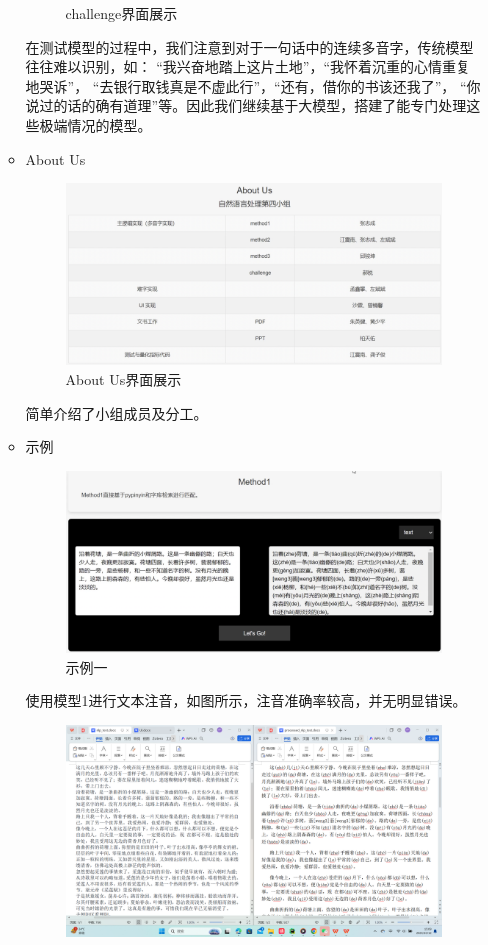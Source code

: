 \documentclass[12pt,hyperref,a4paper,UTF8]{ctexart}
\begin{document}
\begin{itemize}
\begin{itemize}
\begin{figure}[H]
            \caption{challenge界面展示}
            \label{fig6}
        \end{figure}
        在测试模型的过程中，我们注意到对于一句话中的连续多音字，传统模型往往难以识别，如： “我兴奋地踏上这片土地”，“我怀着沉重的心情重复地哭诉”， “去银行取钱真是不虚此行”，“还有，借你的书该还我了”， “你说过的话的确有道理”等。因此我们继续基于大模型，搭建了能专门处理这些极端情况的模型。
        \item About Us
        \begin{figure}[H]
            \centering
            \includegraphics[width=0.7\linewidth]{figures/fig7.png}
            \caption{About Us界面展示}
            \label{fig7}
        \end{figure}
        简单介绍了小组成员及分工。
        \item 示例
        \begin{figure}[H]
            \centering
            \includegraphics[width=0.7\linewidth]{figures/fig8.png}
            \caption{示例一}
            \label{fig8}
        \end{figure}
        使用模型1进行文本注音，如图所示，注音准确率较高，并无明显错误。
        \begin{figure}[H]
            \centering
            \includegraphics[width=0.7\linewidth]{figures/fig9.pic.jpg}

\end{figure}
\end{itemize}
\end{itemize}
\end{document}
